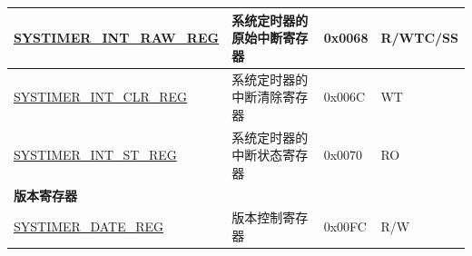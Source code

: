 \begin{longtable}{ | p{5.5cm} | p{7.0cm} | p{1.3cm} | p{1.7cm} | }
\hyperref[regdesc:SYSTIMERINTRAWREG]{SYSTIMER\_INT\_RAW\_REG} & 系统定时器的原始中断寄存器 & 0x0068 & R/WTC/SS \\ \hline
\hyperref[regdesc:SYSTIMERINTCLRREG]{SYSTIMER\_INT\_CLR\_REG} & 系统定时器的中断清除寄存器 & 0x006C & WT \\ \hline
\hyperref[regdesc:SYSTIMERINTSTREG]{SYSTIMER\_INT\_ST\_REG} & 系统定时器的中断状态寄存器 & 0x0070 & RO \\ \hline
\multicolumn{4}{|l|}{\textbf{版本寄存器}} \\ \hline
\hyperref[regdesc:SYSTIMERDATEREG]{SYSTIMER\_DATE\_REG} & 版本控制寄存器 & 0x00FC & R/W \\ \hline
\end{longtable}
